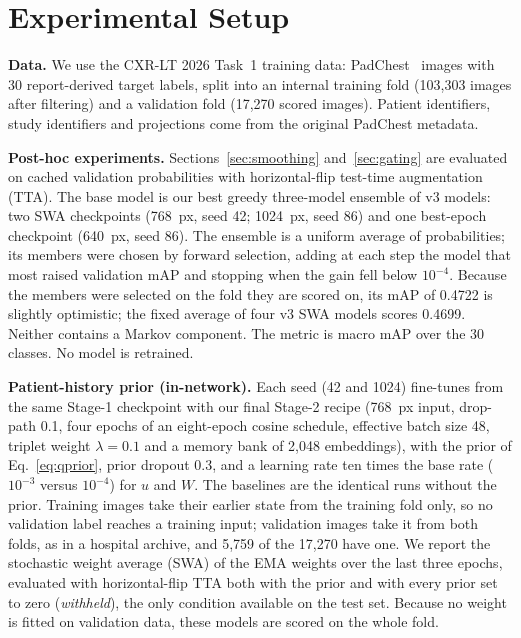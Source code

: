 \documentclass[conference]{IEEEtran}
\begin{document}
\section{Experimental Setup}
\label{sec:setup}
\textbf{Data.} We use the CXR-LT 2026 Task~1 training data: PadChest~\cite{b9} images with 30 report-derived target labels, split into an internal training fold (103,303 images after filtering) and a validation fold (17,270 scored images). Patient identifiers, study identifiers and projections come from the original PadChest metadata.

\textbf{Post-hoc experiments.} Sections~\ref{sec:smoothing} and~\ref{sec:gating} are evaluated on cached validation probabilities with horizontal-flip test-time augmentation (TTA). The base model is our best greedy three-model ensemble of v3 models: two SWA checkpoints (768~px, seed 42; 1024~px, seed 86) and one best-epoch checkpoint (640~px, seed 86). The ensemble is a uniform average of probabilities; its members were chosen by forward selection, adding at each step the model that most raised validation mAP and stopping when the gain fell below $10^{-4}$. Because the members were selected on the fold they are scored on, its mAP of 0.4722 is slightly optimistic; the fixed average of four v3 SWA models scores 0.4699. Neither contains a Markov component. The metric is macro mAP over the 30 classes. No model is retrained.

\textbf{Patient-history prior (in-network).} Each seed (42 and 1024) fine-tunes from the same Stage-1 checkpoint with our final Stage-2 recipe (768~px input, drop-path 0.1, four epochs of an eight-epoch cosine schedule, effective batch size 48, triplet weight $\lambda = 0.1$ and a memory bank of 2,048 embeddings), with the prior of Eq.~\eqref{eq:qprior}, prior dropout 0.3, and a learning rate ten times the base rate ($10^{-3}$ versus $10^{-4}$) for $u$ and $W$. The baselines are the identical runs without the prior. Training images take their earlier state from the training fold only, so no validation label reaches a training input; validation images take it from both folds, as in a hospital archive, and 5,759 of the 17,270 have one. We report the stochastic weight average (SWA) of the EMA weights over the last three epochs, evaluated with horizontal-flip TTA both with the prior and with every prior set to zero (\emph{withheld}), the only condition available on the test set. Because no weight is fitted on validation data, these models are scored on the whole fold.
\end{document}
